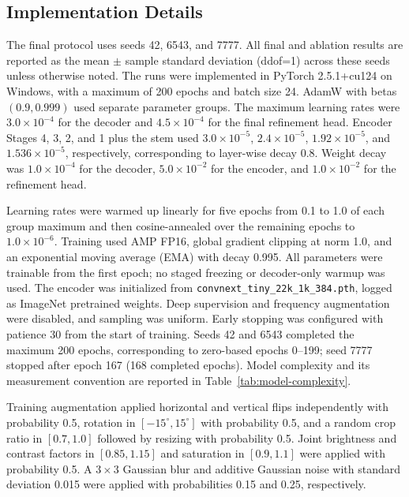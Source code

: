 \subsection{Implementation Details}\label{implementation-details}

The final protocol uses seeds 42, 6543, and 7777. All final and ablation
results are reported as the mean $\pm$ sample standard deviation (ddof=1) across
these seeds unless otherwise noted. The runs were implemented
in PyTorch 2.5.1+cu124 on Windows, with a maximum of 200 epochs and batch size 24.
AdamW with betas
$(0.9,0.999)$ used separate parameter groups. The maximum learning rates
were $3.0\times10^{-4}$ for the decoder and $4.5\times10^{-4}$ for the
final refinement head. Encoder Stages 4, 3, 2, and 1 plus the stem used
$3.0\times10^{-5}$, $2.4\times10^{-5}$, $1.92\times10^{-5}$, and
$1.536\times10^{-5}$, respectively, corresponding to layer-wise decay
0.8. Weight decay was $1.0\times10^{-4}$ for the decoder,
$5.0\times10^{-2}$ for the encoder, and $1.0\times10^{-2}$ for the
refinement head.

Learning rates were warmed up linearly for five epochs from 0.1 to 1.0
of each group maximum and then cosine-annealed over the remaining epochs
to $1.0\times10^{-6}$. Training used AMP FP16, global gradient clipping
at norm 1.0, and an exponential moving average (EMA) with decay 0.995.
All parameters were trainable from the first epoch; no staged freezing
or decoder-only warmup was used. The encoder was initialized from
\texttt{convnext\_tiny\_22k\_1k\_384.pth}, logged as ImageNet pretrained
weights. Deep supervision and frequency augmentation were disabled, and
sampling was uniform. Early stopping was configured with patience 30
from the start of training. Seeds 42 and 6543 completed the maximum 200
epochs, corresponding to zero-based epochs 0--199; seed 7777 stopped after
epoch 167 (168 completed epochs). Model complexity and
its measurement convention are reported in Table~\ref{tab:model-complexity}.

Training augmentation applied horizontal and vertical flips independently
with probability 0.5, rotation in $[-15^{\circ},15^{\circ}]$ with
probability 0.5, and a random crop ratio in $[0.7,1.0]$ followed by
resizing with probability 0.5. Joint brightness and contrast factors in
$[0.85,1.15]$ and saturation in $[0.9,1.1]$ were applied with probability
0.5. A $3\times3$ Gaussian blur and additive Gaussian noise with standard
deviation 0.015 were applied with probabilities 0.15 and 0.25,
respectively.

